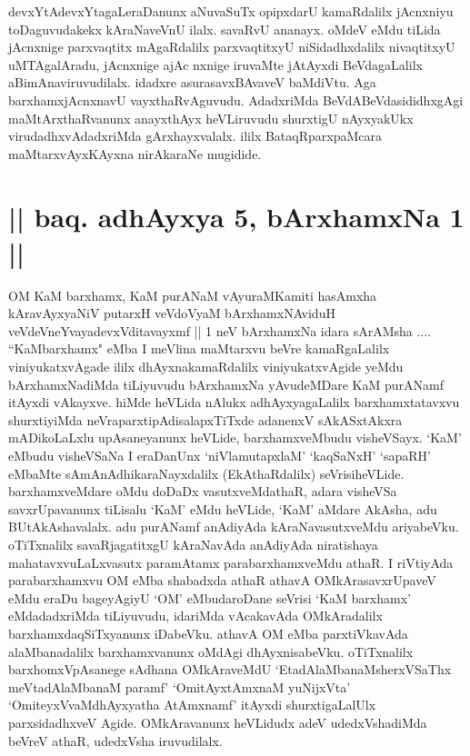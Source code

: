 \begin{artha}
devxYtAdevxYtagaLeraDanunx aNuvaSuTx opipxdarU kamaRdalilx jAcnxniyu toDaguvudakekx kAraNaveVnU ilalx. savaRvU ananayx. oMdeV eMdu tiLida jAcnxnige parxvaqtitx mAgaRdalilx parxvaqtitxyU niSidadhxdalilx nivaqtitxyU uMTAgalAradu, jAcnxnige ajAc	nxnige iruvaMte jAtAyxdi BeVdagaLalilx aBimAnaviruvudilalx. idadxre asurasavxBAvaveV baMdiVtu. Aga barxhamxjAcnxnavU vayxthaRvAguvudu. AdadxriMda BeVdABeVdasididhxgAgi maMtArxthaRvanunx anayxthAyx heVLiruvudu shurxtigU nAyxyakUkx virudadhxvAdadxriMda gArxhayxvalalx. ililx BataqRparxpaMcara maMtarxvAyxKAyxna nirAkaraNe mugidide.
\end{artha}

\section*{|| baq. adhAyxya 5, bArxhamxNa 1 ||}

\begin{artha}
OM KaM barxhamx, KaM purANaM vAyuraMKamiti hasAmxha kAravAyxyaNiV putarxH veVdoVyaM bArxhamxNAviduH veVdeVneYvayadevxVditavayxmf || 1 neV bArxhamxNa idara sArAMsha .... ``KaMbarxhamx"  eMba I meVlina maMtarxvu beVre kamaRgaLalilx viniyukatxvAgade ililx dhAyxnakamaRdalilx viniyukatxvAgide yeMdu bArxhamxNadiMda tiLiyuvudu bArxhamxNa yAvudeMDare KaM purANamf itAyxdi vAkayxve. hiMde heVLida nAlukx adhAyxyagaLalilx barxhamxtatavxvu shurxtiyiMda neVraparxtipAdisalapxTiTxde adanenxV sAkASxtAkxra mADikoLaLxlu upAsaneyanunx heVLide, barxhamxveMbudu visheVSayx. `KaM' eMbudu visheVSaNa I eraDanUnx `niVlamutapxlaM' `kaqSaNxH' `sapaRH' eMbaMte sAmAnAdhikaraNayxdalilx (EkAthaRdalilx) seVrisiheVLide. barxhamxveMdare oMdu doDaDx vasutxveMdathaR, adara visheVSa savxrUpavanunx tiLisalu `KaM' eMdu heVLide, `KaM' aMdare AkAsha, adu BUtAkAshavalalx. adu purANamf anAdiyAda kAraNavasutxveMdu ariyabeVku. oTiTxnalilx savaRjagatitxgU kAraNavAda anAdiyAda niratishaya mahatavxvuLaLxvasutx paramAtamx parabarxhamxveMdu athaR. I riVtiyAda parabarxhamxvu OM eMba shabadxda athaR athavA OMkArasavxrUpaveV eMdu eraDu bageyAgiyU `OM' eMbudaroDane seVrisi `KaM barxhamx' eMdadadxriMda tiLiyuvudu, idariMda vAcakavAda OMkAradalilx barxhamxdaqSiTxyanunx iDabeVku. athavA OM eMba parxtiVkavAda alaMbanadalilx barxhamxvanunx oMdAgi dhAyxnisabeVku. oTiTxnalilx barxhomxVpAsanege sAdhana OMkAraveMdU `EtadAlaMbanaMsherxVSaThx meVtadAlaMbanaM paramf' `OmitAyxtAmxnaM yuNijxVta' `OmiteyxVvaMdhAyxyatha AtAmxnamf' itAyxdi shurxtigaLalUlx parxsidadhxveV Agide. OMkAravanunx heVLidudx adeV udedxVshadiMda beVreV athaR, udedxVsha iruvudilalx.
\end{artha}

